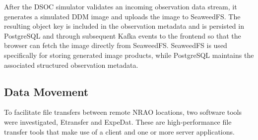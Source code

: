 \documentclass[12pt]{article}
\begin{document}
After the DSOC simulator validates an incoming observation data stream, it generates a simulated DDM image and uploads the image to SeaweedFS. The resulting object key is included in the observation metadata and is persisted in PostgreSQL and through subsequent Kafka events to the frontend so that the browser can fetch the image directly from SeaweedFS. SeaweedFS is used specifically for storing generated image products, while PostgreSQL maintains the associated structured observation metadata.
    
\subsection*{Data Movement}

  To facilitate file transfers between remote NRAO locations, two software tools were investigated, Etransfer and ExpeDat. These are high-performance file transfer tools that make use of a client and one or more server applications.
\end{document}
